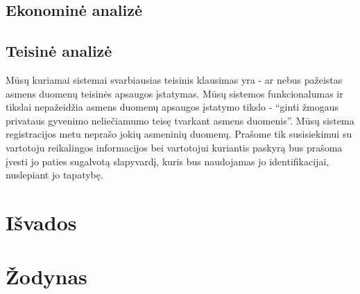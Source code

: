 \documentclass[oneside]{VUMIFPSkursinis}
\begin{document}
	\subsection{Ekonominė analizė}
	\subsection{Teisinė analizė}
Mūsų kuriamai sistemai svarbiausias teisinis klausimas yra - ar nebus pažeistas asmens duomenų teisinės apsaugos įstatymas. Mūsų sistemos funkcionalumas ir tikslai nepažeidžia asmens duomenų apsaugos įstatymo tikslo - “ginti žmogaus privataus gyvenimo neliečiamumo teisę tvarkant asmens duomenis”. Mūsų sistema registracijos metu neprašo jokių asmeninių duomenų. Prašome tik susisiekimui su vartotoju reikalingos informacijos bei vartotojui kuriantis paskyrą bus prašoma įvesti jo paties sugalvotą slapyvardį, kuris bus naudojamas jo identifikacijai, nuslepiant jo tapatybę.
\section{Išvados}
\section{Žodynas}
\end{document}
